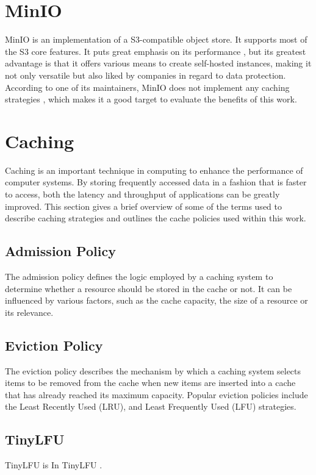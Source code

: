 \section{MinIO}
MinIO is an implementation of a S3-compatible object store. It supports most of the S3 core features. It puts great emphasis on its performance \cite{MINIO_GITHUB}, but its greatest advantage is that it offers various means to create self-hosted instances, making it not only versatile but also liked by companies in regard to data protection.
According to one of its maintainers, MinIO does not implement any caching strategies \cite{MINIO_NO_CACHE}, which makes it a good target to evaluate the benefits of this work.

\section{Caching}

Caching is an important technique in computing to enhance the performance of computer systems. By storing frequently accessed data in a fashion that is faster to access, both the latency and throughput of applications can be greatly improved.
This section gives a brief overview of some of the terms used to describe caching strategies and outlines the cache policies used within this work.

\subsection{Admission Policy}
The admission policy defines the logic employed by a caching system to determine whether a resource should be stored in the cache or not. It can be influenced by various factors, such as the cache capacity, the size of a resource or its relevance.

\subsection{Eviction Policy}
The eviction policy describes the mechanism by which a caching system selects items to be removed from the cache when new items are inserted into a cache that has already reached its maximum capacity. Popular eviction policies include the Least Recently Used (LRU), and Least Frequently Used (LFU) strategies.

\subsection{TinyLFU}
\label{tiny_lfu}
TinyLFU is 
In TinyLFU .

